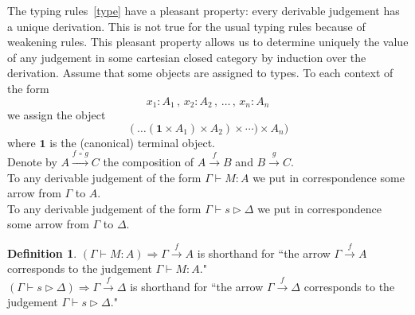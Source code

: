 \documentclass[11pt]{amsart}
\theoremstyle{plain}
\theoremstyle{definition}
\newtheorem{definition}[theorem]{Definition}
\theoremstyle{remark}
\numberwithin{equation}{section}
\newcommand{\tri}{\triangleright}
\newcommand{\mi}{\,,\,}
\newcommand{\arrow}{\rightarrow}
\begin{document}
The typing rules~\ref{type} have a pleasant property: every
derivable judgement has a unique derivation. This is not true for
the usual typing rules because of weakening rules. This pleasant
property allows us to  determine uniquely the value of any
judgement in some cartesian closed category by induction over the
derivation. Assume that some objects are assigned to types. To
each context of the form
$$x_1:A_1 \mi x_2:A_2\mi\ldots\mi x_n:A_n$$
we assign the object
$$(\ldots(\mathbf{1}\times A_1)\times A_2)\times\cdots)\times
A_n)$$ where $\mathbf{1}$ is the (canonical) terminal object.\\
Denote by $A\overset{f\,\circ\, g}{\arrow} C$ the composition of
$A\overset{f}{\arrow}B$ and
$B\overset{g}{\arrow}C$.\\
 To any derivable judgement of the form
$\Gamma\vdash M:A$ we put in correspondence some arrow from
$\Gamma$ to $A$.\\
 To any derivable judgement of the form
$\Gamma\vdash s\tri\Delta$ we put in correspondence some arrow
from $\Gamma$ to $\Delta$.
\begin{definition}
 $(\Gamma\vdash
M:A)\boldsymbol{\Rightarrow}\Gamma\overset{f}{\arrow} A$
  is shorthand for  ``the arrow $\Gamma\overset{f}{\arrow} A$ corresponds to the judgement $\Gamma\vdash
  M:A$."\\
   $(\Gamma\vdash
s\tri\Delta)\boldsymbol{\Rightarrow} \Gamma\overset{f}{\arrow}
\Delta$ is shorthand for ``the arrow $\Gamma\overset{f}{\arrow}
\Delta$ corresponds to the judgement $\Gamma\vdash s\tri\Delta$."
\end{definition}
\newpage
\end{document}
